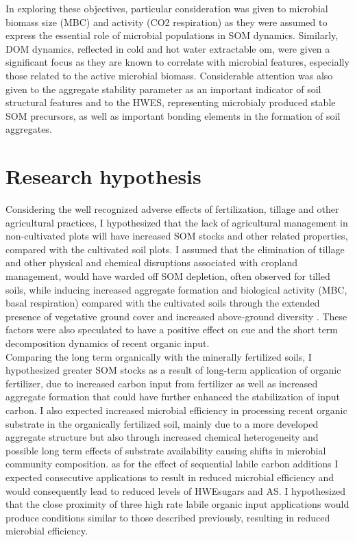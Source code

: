 	In exploring these objectives, particular consideration was given to microbial biomass size (MBC)  and activity (CO2 respiration) as they were assumed to express the essential role of microbial populations in SOM dynamics. Similarly, DOM dynamics, reflected in cold and hot water extractable \gls{om}, were given a significant focus as they are known to correlate with microbial features, especially those related to the active microbial biomass.  Considerable attention was also given to the aggregate stability parameter as an important indicator of soil structural features and to the HWES, representing microbialy produced stable SOM precursors, as well as important bonding elements in the formation of soil aggregates.

\section{Research hypothesis}
	Considering the well recognized adverse effects of fertilization, tillage and other agricultural practices, I hypothesized that the lack of agricultural management in non-cultivated plots will have increased SOM stocks and other related properties, compared with the cultivated soil plots. I assumed that the elimination of tillage and other physical and chemical disruptions associated with cropland management, would have warded off SOM depletion, often observed for tilled soils, while inducing increased aggregate formation and biological activity (MBC, basal respiration)  compared with the cultivated soils through the extended presence of vegetative ground cover and increased above-ground diversity . These factors were also speculated to have a positive effect on \gls{cue} and the short term decomposition dynamics of recent organic input.\\
	Comparing the long term organically with the minerally fertilized soils, I hypothesized greater SOM stocks as a result of long-term application of organic fertilizer, due to increased carbon input from fertilizer as well as increased aggregate formation that could have further enhanced the stabilization of input carbon.  I also expected increased microbial efficiency in processing recent organic substrate in the organically fertilized soil, mainly due to a more developed aggregate structure but also through increased chemical heterogeneity and possible long term effects of substrate availability causing shifts in microbial community composition.
	as for the effect of sequential labile carbon additions I expected consecutive applications to result in reduced microbial efficiency and would consequently lead to reduced levels of HWEsugars and AS.  I hypothesized that the close proximity of three high rate labile organic input applications would produce conditions similar to those described previously, resulting in reduced microbial efficiency.
